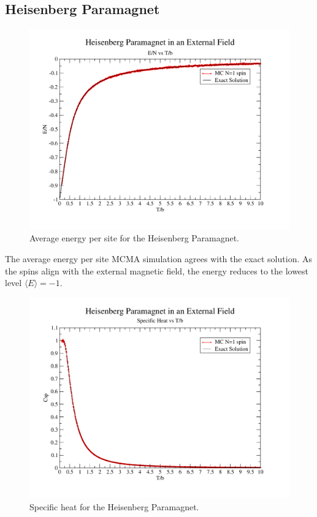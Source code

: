 \documentclass[a4paper,12pt]{article}
\begin{document}
\subsection{Heisenberg Paramagnet}
	\begin{figure}[H]
			\centering
			\includegraphics[scale=0.65]{e_n.pdf}
			\caption{Average energy per site for the Heisenberg Paramagnet.}
			\label{fig:heisenberg_PM_e_avg}
		\end{figure}
		
		The average energy per site MCMA simulation agrees with the exact solution. As the spins align with the external magnetic field, the energy reduces to the lowest level $\langle E \rangle = -1$.
		
		\begin{figure}[H]
			\centering
			\includegraphics[scale=0.65]{sp.pdf}
			\caption{Specific heat for the Heisenberg Paramagnet.}
			\label{fig:heisenberg_PM_sh}
		\end{figure}
		
\end{document}
